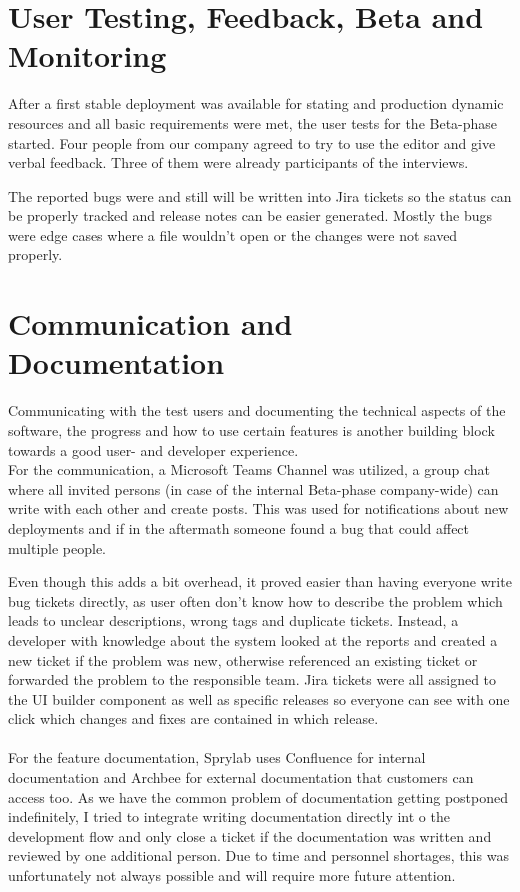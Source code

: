 \section{User Testing, Feedback, Beta and Monitoring}

After a first stable deployment was available for stating and production dynamic resources and all basic requirements were met, the user tests for the Beta-phase started.
Four people from our company agreed to try to use the editor and give verbal feedback. Three of them were already participants of the interviews.

The reported bugs were and still will be written into Jira tickets so the status can be properly tracked and release notes can be easier generated.
Mostly the bugs were edge cases where a file wouldn't open or the changes were not saved properly.


\section{Communication and Documentation}
Communicating with the test users and documenting the technical aspects of the software, the progress and how to use certain features is
another building block towards a good user- and developer experience.
\\
For the communication, a Microsoft Teams Channel was utilized, a group chat where all invited persons (in case of the internal Beta-phase company-wide) can write with each other and create posts.
This was used for notifications about new deployments and if in the aftermath someone found a bug that could affect multiple people.

Even though this adds a bit overhead, it proved easier than having everyone write bug tickets directly, as user often don't know how to describe the problem which leads to unclear descriptions, wrong tags and duplicate tickets.
Instead, a developer with knowledge about the system looked at the reports and created a new ticket if the problem was new, otherwise referenced an existing ticket or forwarded the problem to the responsible team.
Jira tickets were all assigned to the UI builder component as well as specific releases so everyone can see with one click which changes and fixes are contained in which release.
\\\\
For the feature documentation, Sprylab uses Confluence for internal documentation and Archbee for external documentation that customers can access too.
As we have the common problem of documentation getting postponed indefinitely, I tried to integrate writing documentation directly int o the development flow and only close a ticket if the documentation
was written and reviewed by one additional person. Due to time and personnel shortages, this was unfortunately not always possible and will require more future attention.

